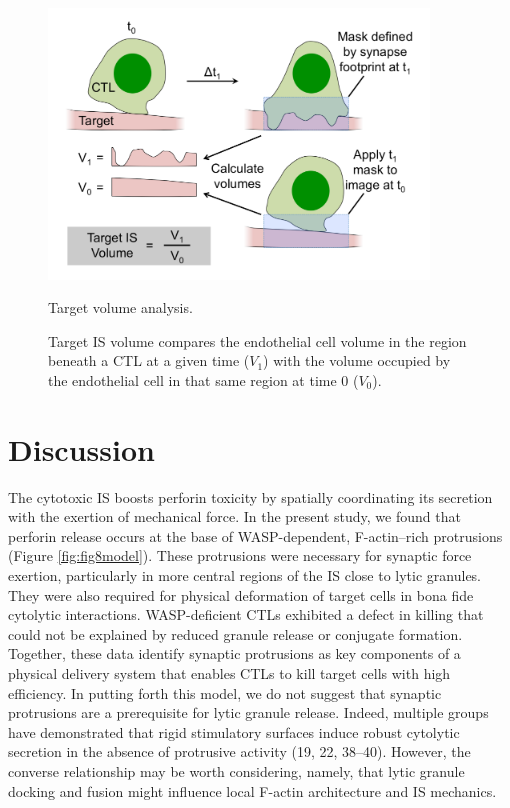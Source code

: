 \begin{figure}[htbp]
	\centering
	\includegraphics[width=0.9\textwidth]{../figures/chapter2/fig7supp2.png}
	\caption{Target volume analysis.}
	\caption*{Target IS volume compares the endothelial cell volume in the region beneath a CTL at a given time ($V_1$) with the volume occupied by the endothelial cell in that same region at time 0 ($V_0$).}
	\label{fig:fig7supp2}
\end{figure}


\section{Discussion}
The cytotoxic IS boosts perforin toxicity by spatially coordinating its secretion with the exertion of mechanical force. In the present study, we found that perforin release occurs at the base of WASP-dependent, F-actin–rich protrusions (Figure \ref{fig:fig8model}). These protrusions were necessary for synaptic force exertion, particularly in more central regions of the IS close to lytic granules. They were also required for physical deformation of target cells in bona fide cytolytic interactions. WASP-deficient CTLs exhibited a defect in killing that could not be explained by reduced granule release or conjugate formation. Together, these data identify synaptic protrusions as key components of a physical delivery system that enables CTLs to kill target cells with high efficiency. In putting forth this model, we do not suggest that synaptic protrusions are a prerequisite for lytic granule release. Indeed, multiple groups have demonstrated that rigid stimulatory surfaces induce robust cytolytic secretion in the absence of protrusive activity (19, 22, 38–40). However, the converse relationship may be worth considering, namely, that lytic granule docking and fusion might influence local F-actin architecture and IS mechanics.

